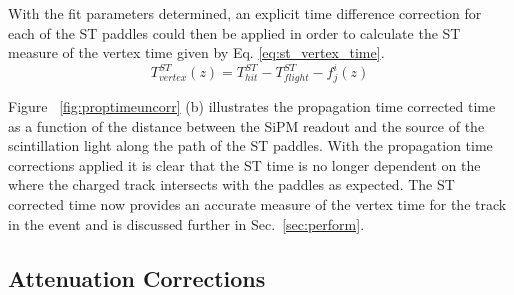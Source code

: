 	
With the fit parameters determined, an explicit time difference correction for each of the ST paddles could then be applied in order to calculate the ST measure of the vertex time given by Eq. \ref{eq:st_vertex_time}.
	\begin{equation}\label{eq:st_vertex_time}
	 	T^{ST}_{vertex}(z) = T^{ST}_{hit} - T^{ST}_{flight} - f^{i}_{j}(z)
	\end{equation} 
	
Figure ~\ref{fig:proptimeuncorr} (b) illustrates the propagation time corrected time as a function of the distance between the SiPM readout and the source of the scintillation light along the path of the ST paddles.
With the propagation time corrections applied it is clear that the ST time is no longer dependent on the where the charged track intersects with the paddles as expected.  The ST corrected time now provides an accurate measure of the vertex time for the track in the event and is discussed further in Sec.~\ref{sec:perform}.

\subsection{Attenuation Corrections} \label{sec:calib_ac}


